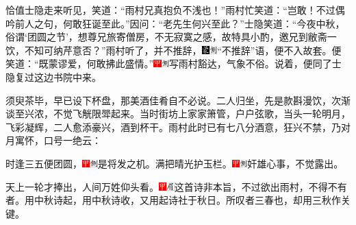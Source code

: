 恰值士隐走来听见，笑道：``雨村兄真抱负不浅也！''雨村忙笑道：``岂敢！不过偶吟前人之句，何敢狂诞至此。''因问：``老先生何兴至此？''士隐笑道：``今夜中秋，俗谓`团圆之节'，想尊兄旅寄僧房，不无寂寞之感，故特具小酌，邀兄到敝斋一饮，不知可纳芹意否？''雨村听了，并不推辞，{\includegraphics[width=3mm]{../Images/00006}\includegraphics[width=3mm]{../Images/00011}\footnotesize \kaishu ``不推辞''语，便不入故套。}便笑道：``既蒙谬爱，何敢拂此盛情。''{\includegraphics[width=3mm]{../Images/00002}\includegraphics[width=3mm]{../Images/00011}\footnotesize \kaishu 写雨村豁达，气象不俗。}说着，便同了士隐复过这边书院中来。

须臾茶毕，早已设下杯盘，那美酒佳肴自不必说。二人归坐，先是款斟漫饮，次渐谈至兴浓，不觉飞觥限斝起来。当时街坊上家家箫管，户户弦歌，当头一轮明月，飞彩凝辉，二人愈添豪兴，酒到杯干。雨村此时已有七八分酒意，狂兴不禁，乃对月寓怀，口号一绝云：

时逢三五便团圆，{\includegraphics[width=3mm]{../Images/00002}\includegraphics[width=3mm]{../Images/00011}\footnotesize \kaishu 是将发之机。}满把晴光护玉栏。{\includegraphics[width=3mm]{../Images/00002}\includegraphics[width=3mm]{../Images/00011}\footnotesize \kaishu 奸雄心事，不觉露出。}

天上一轮才捧出，人间万姓仰头看。{\includegraphics[width=3mm]{../Images/00002}\includegraphics[width=3mm]{../Images/00010}\footnotesize \kaishu 这首诗非本旨，不过欲出雨村，不得不有者。用中秋诗起，用中秋诗收，又用起诗社于秋日。所叹者三春也，却用三秋作关键。}


